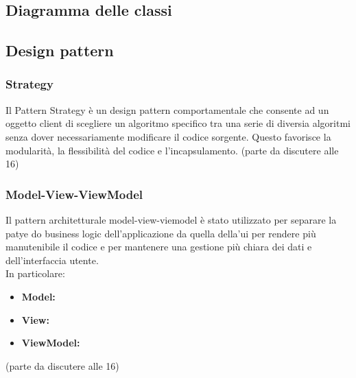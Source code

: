 \subsection{Diagramma delle classi}

\subsection{Design pattern}
\subsubsection{Strategy}
Il Pattern Strategy è un design pattern comportamentale che consente ad un oggetto client di scegliere un algoritmo specifico tra una serie di diversia algoritmi senza dover necessariamente modificare il codice sorgente. Questo favorisce la modularità, la flessibilità del codice e l'incapsulamento. 
(parte da discutere alle 16)

\subsubsection{Model-View-ViewModel}
Il pattern architetturale model-view-viemodel è stato utilizzato per separare la patye do business logic dell'applicazione da quella della'ui per rendere più manutenibile il codice e per mantenere una gestione più chiara dei dati e dell'interfaccia utente. \\
In particolare: 
\begin{itemize}
    \item \textbf{Model:}
    \item \textbf{View:}
    \item \textbf{ViewModel:}
\end{itemize}
(parte da discutere alle 16)
